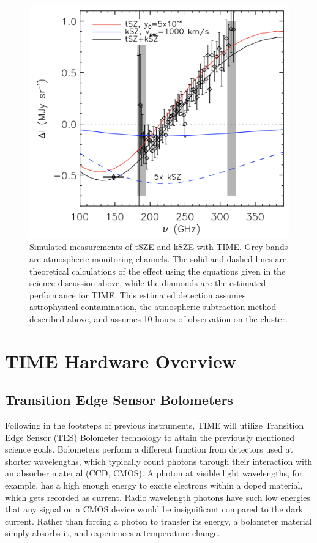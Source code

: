\documentclass[manuscript]{aastex}
\begin{document}
\vspace{30.0cm}
\hspace*{-0.8cm}
\begin{figure}[H]
\centering
\captionsetup{width=\textwidth}
\includegraphics[width=\textwidth]{time1.png}
\caption[Expected TIME kSZE \& tSZE Measurements]{Simulated measurements of tSZE and kSZE with TIME. Grey bands are atmospheric monitoring channels. The solid and dashed lines are theoretical calculations of the effect using the equations given in the science discussion above, while the diamonds are the estimated performance for TIME. This estimated detection assumes astrophysical contamination, the atmospheric subtraction method described above, and assumes 10 hours of observation on the cluster.}
\label{fig:time1}
\end{figure}

\newpage
\section{TIME Hardware Overview}
\subsection{Transition Edge Sensor Bolometers}
Following in the footsteps of previous instruments, TIME will utilize Transition Edge Sensor (TES) Bolometer technology to attain the previously mentioned science goals. Bolometers perform a different function from detectors used at shorter wavelengths, which typically count photons through their interaction with an absorber material (CCD, CMOS). A photon at visible light wavelengths, for example, has a high enough energy to excite electrons within a doped material, which gets recorded as current. Radio wavelength photons have such low energies that any signal on a CMOS device would be insignificant compared to the dark current. Rather than forcing a photon to transfer its energy, a bolometer material simply absorbs it, and experiences a temperature change.
\end{document}
